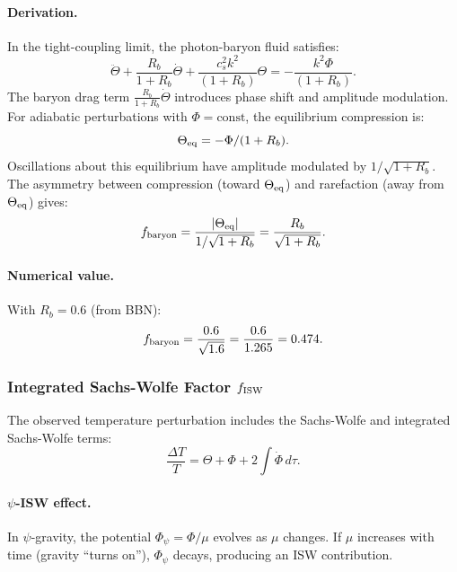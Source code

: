 \paragraph{Derivation.}
In the tight-coupling limit, the photon-baryon fluid satisfies:
\begin{equation}
\ddot{\Theta} + \frac{R_b}{1+R_b} \dot{\Theta} + \frac{c_s^2 k^2}{(1+R_b)} \Theta = -\frac{k^2 \Phi}{(1+R_b)}.
\end{equation}
The baryon drag term $\frac{R_b}{1+R_b}\dot{\Theta}$ introduces phase shift and amplitude modulation. For adiabatic perturbations with $\Phi = \text{const}$, the equilibrium compression is:
\begin{equation}
\Theta_{\rm eq} = -\Phi/(1+R_b).
\end{equation}
Oscillations about this equilibrium have amplitude modulated by $1/\sqrt{1+R_b}$. The asymmetry between compression (toward $\Theta_{\rm eq}$) and rarefaction (away from $\Theta_{\rm eq}$) gives:
\begin{equation}
f_{\rm baryon} = \frac{|\Theta_{\rm eq}|}{1/\sqrt{1+R_b}} = \frac{R_b}{\sqrt{1+R_b}}.
\end{equation}

\paragraph{Numerical value.}
With $R_b = 0.6$ (from BBN):
\begin{equation}
f_{\rm baryon} = \frac{0.6}{\sqrt{1.6}} = \frac{0.6}{1.265} = 0.474.
\end{equation}

\subsubsection{Integrated Sachs-Wolfe Factor $f_{\rm ISW}$}

The observed temperature perturbation includes the Sachs-Wolfe and integrated Sachs-Wolfe terms:
\begin{equation}
\frac{\Delta T}{T} = \Theta + \Phi + 2\int \dot{\Phi}\,d\tau.
\end{equation}

\paragraph{$\psi$-ISW effect.}
In $\psi$-gravity, the potential $\Phi_\psi = \Phi/\mu$ evolves as $\mu$ changes. If $\mu$ increases with time (gravity ``turns on''), $\Phi_\psi$ decays, producing an ISW contribution.

